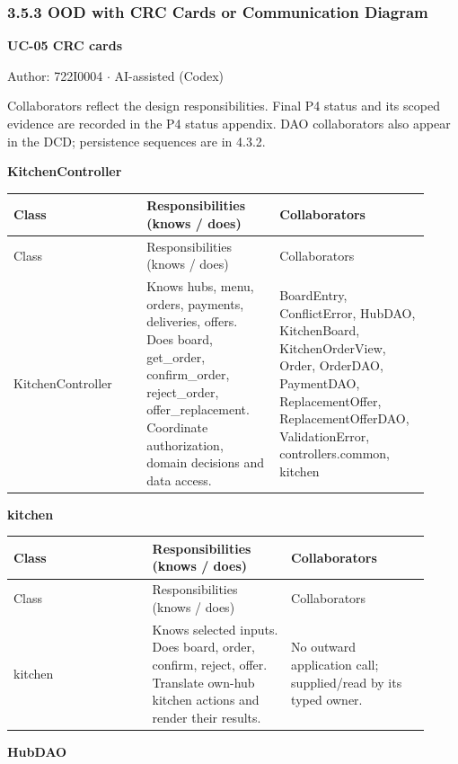 \subsubsection*{3.5.3 OOD with CRC Cards or Communication Diagram}
\label{CRC-UC-05}
\textbf{UC-05 CRC cards}

Author: 722I0004 \ensuremath{\cdot} AI-assisted (Codex)

Collaborators reflect the design responsibilities. Final P4 status and its scoped evidence are recorded in the P4 status appendix. DAO collaborators also appear in the DCD; persistence sequences are in 4.3.2.

\textbf{KitchenController}

\begin{longtable}{>{\raggedright\arraybackslash}p{0.3067\linewidth}>{\raggedright\arraybackslash}p{0.3067\linewidth}>{\raggedright\arraybackslash}p{0.3067\linewidth}}
Class & Responsibilities (knows / does) & Collaborators \\
\hline\endfirsthead
Class & Responsibilities (knows / does) & Collaborators \\
\hline\endhead
KitchenController & Knows hubs, menu, orders, payments, deliveries, offers. Does board, get\_order, confirm\_order, reject\_order, offer\_replacement. Coordinate authorization, domain decisions and data access. & BoardEntry, ConflictError, HubDAO, KitchenBoard, KitchenOrderView, Order, OrderDAO, PaymentDAO, ReplacementOffer, ReplacementOfferDAO, ValidationError, controllers.common, kitchen \\
\end{longtable}
\textbf{kitchen}

\begin{longtable}{>{\raggedright\arraybackslash}p{0.3067\linewidth}>{\raggedright\arraybackslash}p{0.3067\linewidth}>{\raggedright\arraybackslash}p{0.3067\linewidth}}
Class & Responsibilities (knows / does) & Collaborators \\
\hline\endfirsthead
Class & Responsibilities (knows / does) & Collaborators \\
\hline\endhead
kitchen & Knows selected inputs. Does board, order, confirm, reject, offer. Translate own-hub kitchen actions and render their results. & No outward application call; supplied/read by its typed owner. \\
\end{longtable}
\textbf{HubDAO}

